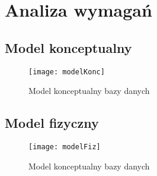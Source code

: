 \section{Analiza wymagań}

\subsection{Model konceptualny}

\begin{figure}[H]
	\centering
	\texttt{[image: modelKonc]}
	\caption{Model konceptualny bazy danych}
	\label{rys:modelKonc}
\end{figure}


\subsection{Model fizyczny}

\begin{figure}[H]
	\centering
	\texttt{[image: modelFiz]}
	\caption{Model konceptualny bazy danych}
	\label{rys:modelFiz}
\end{figure}